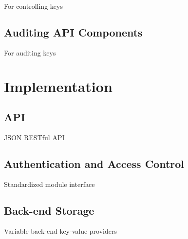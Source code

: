 For controlling keys

\subsection{Auditing API Components}

For auditing  keys

\section{Implementation}

\subsection{API}

JSON RESTful API

\subsection{Authentication and Access Control}

Standardized module interface

\subsection{Back-end Storage}

Variable back-end key-value providers
